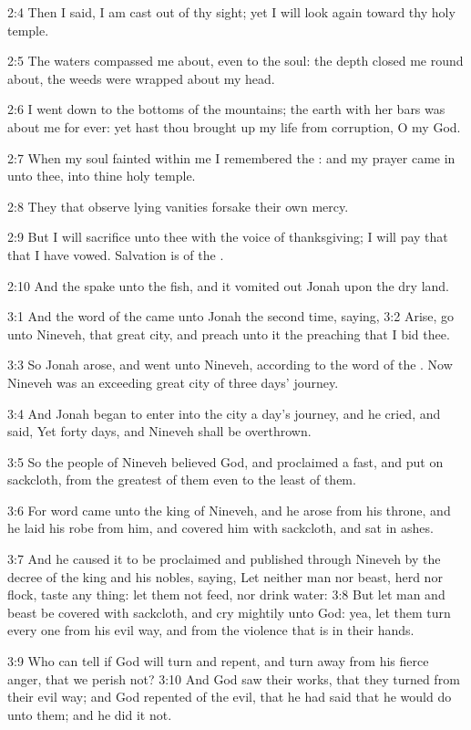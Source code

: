 2:4 Then I said, I am cast out of thy sight; yet I will look again
toward thy holy temple.

2:5 The waters compassed me about, even to the soul: the depth closed
me round about, the weeds were wrapped about my head.

2:6 I went down to the bottoms of the mountains; the earth with her
bars was about me for ever: yet hast thou brought up my life from
corruption, O \LORD my God.

2:7 When my soul fainted within me I remembered the \LORD: and my
prayer came in unto thee, into thine holy temple.

2:8 They that observe lying vanities forsake their own mercy.

2:9 But I will sacrifice unto thee with the voice of thanksgiving; I
will pay that that I have vowed. Salvation is of the \LORD.

2:10 And the \LORD spake unto the fish, and it vomited out Jonah upon
the dry land.

3:1 And the word of the \LORD came unto Jonah the second time, saying,
3:2 Arise, go unto Nineveh, that great city, and preach unto it the
preaching that I bid thee.

3:3 So Jonah arose, and went unto Nineveh, according to the word of
the \LORD. Now Nineveh was an exceeding great city of three days'
journey.

3:4 And Jonah began to enter into the city a day's journey, and he
cried, and said, Yet forty days, and Nineveh shall be overthrown.

3:5 So the people of Nineveh believed God, and proclaimed a fast, and
put on sackcloth, from the greatest of them even to the least of them.

3:6 For word came unto the king of Nineveh, and he arose from his
throne, and he laid his robe from him, and covered him with sackcloth,
and sat in ashes.

3:7 And he caused it to be proclaimed and published through Nineveh by
the decree of the king and his nobles, saying, Let neither man nor
beast, herd nor flock, taste any thing: let them not feed, nor drink
water: 3:8 But let man and beast be covered with sackcloth, and cry
mightily unto God: yea, let them turn every one from his evil way, and
from the violence that is in their hands.

3:9 Who can tell if God will turn and repent, and turn away from his
fierce anger, that we perish not?  3:10 And God saw their works, that
they turned from their evil way; and God repented of the evil, that he
had said that he would do unto them; and he did it not.

